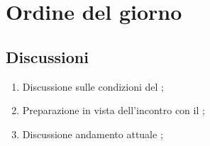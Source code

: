 \section{Ordine del giorno} \label{sec:agenda}
\subsection{Discussioni} \label{subsec:discussione}
\begin{enumerate}
    \item Discussione sulle condizioni del ;
    \item Preparazione in vista dell'incontro con il ;
    \item Discussione andamento attuale ;
\end{enumerate}
